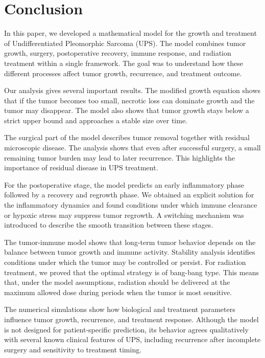 \documentclass[11pt, reqno]{amsart}
\numberwithin{equation}{section}
\theoremstyle{definition}
\begin{document}
\section{Conclusion}

In this paper, we developed a mathematical model for the growth and treatment of Undifferentiated Pleomorphic Sarcoma (UPS). The model combines tumor growth, surgery, postoperative recovery, immune response, and radiation treatment within a single framework. The goal was to understand how these different processes affect tumor growth, recurrence, and treatment outcome.

Our analysis gives several important results. The modified growth equation shows that if the tumor becomes too small, necrotic loss can dominate growth and the tumor may disappear. The model also shows that tumor growth stays below a strict upper bound and approaches a stable size over time.

The surgical part of the model describes tumor removal together with residual microscopic disease. The analysis shows that even after successful surgery, a small remaining tumor burden may lead to later recurrence. This highlights the importance of residual disease in UPS treatment.

For the postoperative stage, the model predicts an early inflammatory phase followed by a recovery and regrowth phase. We
obtained an explicit solution for the inflammatory dynamics and found conditions under which immune clearance or hypoxic stress may suppress tumor regrowth. A switching mechanism was introduced to describe the smooth transition between these stages.

The tumor-immune model shows that long-term tumor behavior depends on the balance between tumor growth and immune activity. Stability analysis identifies conditions under which the tumor may be controlled or persist. For radiation treatment, we proved that the optimal strategy is of bang-bang type. This means that, under the model assumptions, radiation should be delivered at the maximum allowed dose during periods when the tumor is most sensitive.

The numerical simulations show how biological and treatment parameters influence tumor growth, recurrence, and treatment response. Although the model is not designed for patient-specific prediction, its behavior agrees qualitatively with several known clinical features of UPS, including recurrence after incomplete surgery and sensitivity to treatment timing.
\end{document}
